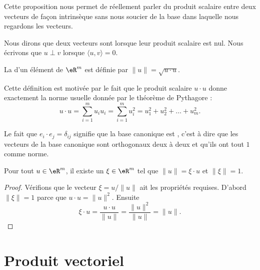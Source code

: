 Cette proposition nous permet de réellement parler du produit scalaire entre deux vecteurs de façon intrinsèque sans nous soucier de la base dans laquelle nous regardons les vecteurs.

Nous dirons que deux vecteurs sont  lorsque leur produit scalaire est nul. Nous écrivons que $u\perp v$ lorsque $\langle u, v\rangle =0$.
\begin{definition}	\label{DefNormeEucleApp}
	La  d'un élément de $\eR^m$ est définie par $\| u \|=\sqrt{u\cdot u}$.
\end{definition}

Cette définition est motivée par le fait que le produit scalaire $u\cdot u$ donne exactement la norme usuelle donnée par le théorème de Pythagore :
\begin{equation}
	u\cdot u=\sum_{i=1}^mu_iu_i=\sum_{i=1}^m u_i^2=u_1^2+u_2^2+\ldots+u_m^2.
\end{equation}

Le fait que $e_i\cdot e_j=\delta_{ij}$ signifie que la base canonique est , c'est à dire que les vecteurs de la base canonique sont orthogonaux deux à deux et qu'ils ont tout $1$ comme norme.

\begin{lemma}\label{LemSclNormeXi}
	Pour tout $u\in\eR^m$, il existe un $\xi\in\eR^m$ tel que $\| u \|=\xi\cdot u$ et $\| \xi \|=1$.
\end{lemma}

\begin{proof}
	Vérifions que le vecteur $\xi=u/\| u \|$ ait les propriétés requises. D'abord $\| \xi \|=1$ parce que $u\cdot u=\| u \|^2$. Ensuite
	\begin{equation}
		\xi\cdot u=\frac{ u\cdot u }{ \| u \| }=\frac{ \| u \|^2 }{ \| u \| }=\| u \|.
	\end{equation}
\end{proof}


\section{Produit vectoriel}

